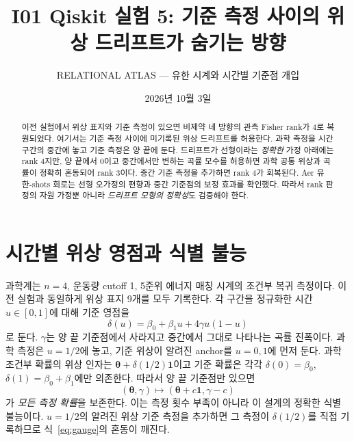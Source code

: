 \documentclass[11pt,a4paper]{article}
\title{I01 Qiskit 실험 5: 기준 측정 사이의 위상 드리프트가 숨기는 방향}
\author{RELATIONAL ATLAS --- 유한 시계와 시간별 기준점 개입}
\date{2026년 10월 3일}
\begin{document}
\maketitle

\begin{abstract}
이전 실험에서 위상 표지와 기준 측정이 있으면 비제약 네 방향의 관측
Fisher rank가 4로 복원되었다. 여기서는 기준 측정 사이에 미기록된
위상 드리프트를 허용한다. 과학 측정을 시간 구간의 중간에 놓고 기준
측정은 양 끝에 둔다. 드리프트가 선형이라는 \emph{정확한} 가정 아래에는
rank 4지만, 양 끝에서 0이고 중간에서만 변하는 곡률 모수를 허용하면
과학 공통 위상과 곡률이 정확히 혼동되어 rank 3이다. 중간 기준 측정을
추가하면 rank 4가 회복된다. Aer 유한-shots 회로는 선형 오가정의
편향과 중간 기준점의 보정 효과를 확인했다. 따라서 rank 판정의 자원
가정뿐 아니라 \emph{드리프트 모형의 정확성}도 검증해야 한다.
\end{abstract}

\section{시간별 위상 영점과 식별 불능}
과학계는 $n=4$, 운동량 cutoff 1, 5준위 에너지 매칭 시계의
조건부 복귀 측정이다. 이전 실험과 동일하게 위상 표지 9개를 모두
기록한다. 각 구간을 정규화한 시간 $u\in[0,1]$에 대해 기준 영점을
\begin{equation}
 \delta(u)=\beta_0+\beta_1 u+4\gamma u(1-u)
 \label{eq:drift}
\end{equation}
로 둔다. $\gamma$는 양 끝 기준점에서 사라지고 중간에서 그대로
나타나는 곡률 진폭이다. 과학 측정은 $u=1/2$에 놓고, 기준 위상이
알려진 anchor를 $u=0,1$에 먼저 둔다. 과학 조건부 확률의 위상 인자는
$\boldsymbol\theta+\delta(1/2)\boldsymbol1$이고 기준 확률은 각각
$\delta(0)=\beta_0$, $\delta(1)=\beta_0+\beta_1$에만 의존한다.
따라서 양 끝 기준점만 있으면
\begin{equation}
 (\boldsymbol\theta,\gamma)\longmapsto
 (\boldsymbol\theta+c\boldsymbol1,\gamma-c)
 \label{eq:gauge}
\end{equation}
가 \emph{모든 측정 확률}을 보존한다. 이는 측정 횟수 부족이 아니라
이 설계의 정확한 식별 불능이다. $u=1/2$의 알려진 위상 기준 측정을
추가하면 그 측정이 $\delta(1/2)$를 직접 기록하므로
식~\eqref{eq:gauge}의 혼동이 깨진다.
\end{document}
